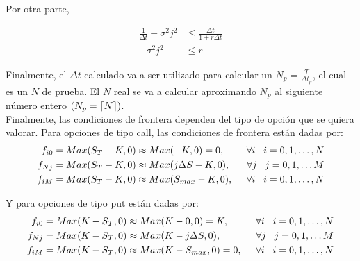 \documentclass{article}
\DeclarePairedDelimiter{\ceil}{\lceil}{\rceil}
\begin{document}
Por otra parte, 

\begin{align*}
    \frac{1}{\Delta t} - \sigma^{2} j^{2} &\leq \frac{\Delta t}{1+r\Delta t} \\
    -\sigma^{2} j^{2} &\leq r
\end{align*}

Finalmente, el $\Delta t$ calculado va a ser utilizado para calcular un $N_p = \frac{T}{\Delta t_p }$, el cual es un $N$ de prueba. El $N$ real se va a calcular aproximando $N_p$ al siguiente número entero $(N_p = \ceil*{N})$. \\

Finalmente, las condiciones de frontera dependen del tipo de opción que se quiera valorar. Para opciones de tipo call, las condiciones de frontera están dadas por:
\begin{align*}
    f_{i0} &= Max(S_T-K,0) \approx Max(-K,0) = 0,  &\forall i \hspace{0.3cm} i = 0,1,\ldots,N\\
    f_{Nj} &= Max(S_T-K,0) \approx Max(j \Delta S - K,0), \hspace{0.2cm} &\forall j \hspace{0.3cm} j = 0,1,\ldots M \\
    f_{iM} &= Max(S_T-K,0) \approx Max(S_{max}-K,0), \hspace{0.2cm} &\forall i \hspace{0.3cm} i = 0,1,\ldots, N
\end{align*}

Y para opciones de tipo put están dadas por:
\begin{align*}
    f_{i0} &= Max(K-S_T,0) \approx Max(K-0,0) = K,  &\forall i \hspace{0.3cm} i = 0,1,\ldots,N\\
    f_{Nj} &= Max(K-S_T,0) \approx Max(K - j \Delta S,0), \hspace{0.2cm} &\forall j \hspace{0.3cm} j = 0,1,\ldots M \\
    f_{iM} &= Max(K-S_T,0) \approx Max(K-S_{max},0) = 0, \hspace{0.2cm} &\forall i \hspace{0.3cm} i = 0,1,\ldots, N
\end{align*}
\end{document}
